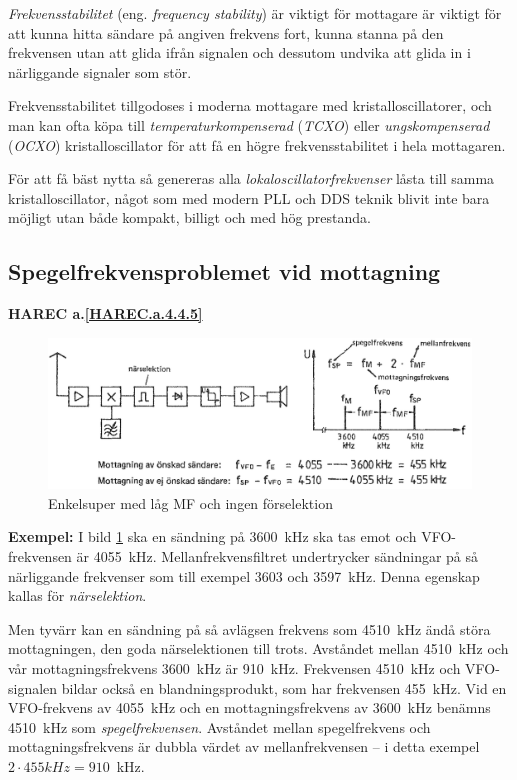 \emph{Frekvensstabilitet} (eng. \emph{frequency stability}) är viktigt för
mottagare är viktigt för att kunna hitta sändare på angiven frekvens fort,
kunna stanna på den frekvensen utan att glida ifrån signalen och dessutom
undvika att glida in i närliggande signaler som stör.

Frekvensstabilitet tillgodoses i moderna mottagare med kristalloscillatorer,
och man kan ofta köpa till \emph{temperaturkompenserad} (\emph{TCXO}) eller
\emph{ungskompenserad} (\emph{OCXO}) kristalloscillator för att få en högre
frekvensstabilitet i hela mottagaren.

För att få bäst nytta så genereras alla \emph{lokaloscillatorfrekvenser} låsta
till samma kristalloscillator, något som med modern PLL och DDS teknik blivit
inte bara möjligt utan både kompakt, billigt och med hög prestanda.

\subsection{Spegelfrekvensproblemet vid mottagning}
\textbf{HAREC a.\ref{HAREC.a.4.4.5}\label{myHAREC.a.4.4.5}}

\begin{figure}
  \includegraphics[width=\textwidth]{images/cropped_pdfs/bild_2_4-22.pdf}
  \caption{Enkelsuper med låg MF och ingen förselektion}
  \label{fig:bildII4-22}
\end{figure}

\textbf{Exempel:}
I bild \ref{fig:bildII4-22} ska en sändning på 3600~kHz ska tas emot och
VFO-frekvensen är 4055~kHz.
Mellanfrekvensfiltret undertrycker sändningar på så närliggande frekvenser
som till exempel 3603 och 3597~kHz.
Denna egenskap kallas för \emph{närselektion}.

Men tyvärr kan en sändning på så avlägsen frekvens som 4510~kHz ändå
störa mottagningen, den goda närselektionen till trots.
Avståndet mellan 4510~kHz och vår mottagningsfrekvens 3600~kHz är 910~kHz.
Frekvensen 4510~kHz och VFO-signalen bildar också en blandningsprodukt,
som har frekvensen 455~kHz.
Vid en VFO-frekvens av 4055~kHz och en mottagningsfrekvens av 3600~kHz benämns
4510~kHz som \emph{spegelfrekvensen}.
Avståndet mellan spegelfrekvens och mottagningsfrekvens är dubbla värdet av
mellanfrekvensen -- i detta exempel \(2 \cdot 455kHz = 910\)~kHz.

